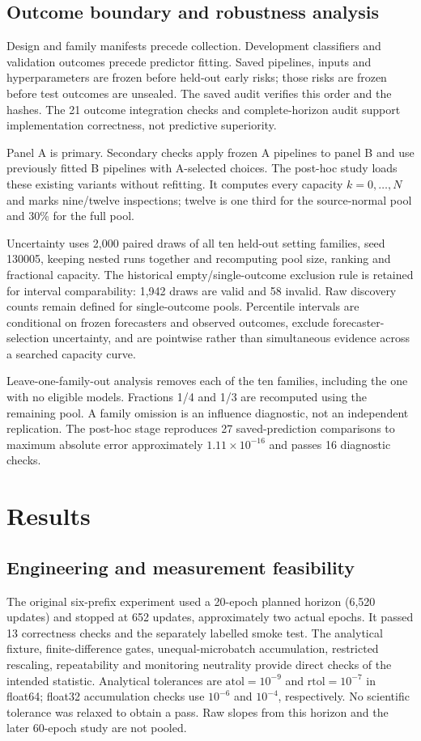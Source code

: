 \documentclass[nolineno]{ieeeaccess}
\begin{document}
\subsection{Outcome boundary and robustness analysis}
Design and family manifests precede collection. Development classifiers and validation outcomes precede predictor fitting. Saved pipelines, inputs and hyperparameters are frozen before held-out early risks; those risks are frozen before test outcomes are unsealed. The saved audit verifies this order and the hashes. The 21 outcome integration checks and complete-horizon audit support implementation correctness, not predictive superiority.

Panel A is primary. Secondary checks apply frozen A pipelines to panel B and use previously fitted B pipelines with A-selected choices. The post-hoc study loads these existing variants without refitting. It computes every capacity $k=0,\ldots,N$ and marks nine/twelve inspections; twelve is one third for the source-normal pool and 30\% for the full pool.

Uncertainty uses 2,000 paired draws of all ten held-out setting families, seed 130005, keeping nested runs together and recomputing pool size, ranking and fractional capacity. The historical empty/single-outcome exclusion rule is retained for interval comparability: 1,942 draws are valid and 58 invalid. Raw discovery counts remain defined for single-outcome pools. Percentile intervals are conditional on frozen forecasters and observed outcomes, exclude forecaster-selection uncertainty, and are pointwise rather than simultaneous evidence across a searched capacity curve.

Leave-one-family-out analysis removes each of the ten families, including the one with no eligible models. Fractions 1/4 and 1/3 are recomputed using the remaining pool. A family omission is an influence diagnostic, not an independent replication. The post-hoc stage reproduces 27 saved-prediction comparisons to maximum absolute error approximately $1.11\times10^{-16}$ and passes 16 diagnostic checks.

\section{Results}
\label{sec:results}
\subsection{Engineering and measurement feasibility}
The original six-prefix experiment used a 20-epoch planned horizon (6,520 updates) and stopped at 652 updates, approximately two actual epochs. It passed 13 correctness checks and the separately labelled smoke test. The analytical fixture, finite-difference gates, unequal-microbatch accumulation, restricted rescaling, repeatability and monitoring neutrality provide direct checks of the intended statistic. Analytical tolerances are $\mathrm{atol}=10^{-9}$ and $\mathrm{rtol}=10^{-7}$ in float64; float32 accumulation checks use $10^{-6}$ and $10^{-4}$, respectively. No scientific tolerance was relaxed to obtain a pass. Raw slopes from this horizon and the later 60-epoch study are not pooled.
\end{document}
